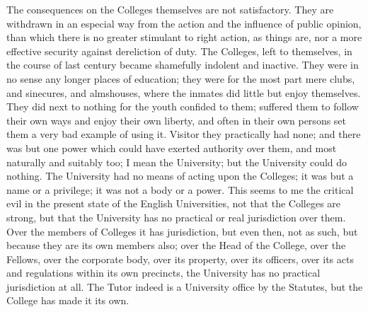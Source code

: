 The consequences on the
Colleges themselves are not satisfactory. They are withdrawn in an
especial way from the action and the influence of public opinion, than
which there is no greater stimulant to right action, as things are,
nor a more effective security against dereliction of duty. The
Colleges, left to themselves, in the course of last century became
shamefully indolent and inactive. They were in no sense any longer
places of education; they were for the most part mere clubs, and
sinecures, and almshouses, where the inmates did little but enjoy
themselves. They did next to nothing for the youth confided to them;
suffered them to follow their own ways and enjoy their own liberty,
and often in their own persons set them a very bad example of using
it. Visitor they practically had none; and there was but one power
which could have exerted authority over them, and most naturally and
suitably too; I mean the University; but the University could do
nothing. The University had no means of acting upon the Colleges; it
was but a name or a privilege; it was not a body or a power. This
seems to me the critical evil in the present state of the English
Universities, not that the Colleges are strong, but that the
University has no practical or real jurisdiction over them. Over the
members of Colleges it has jurisdiction, but even then, not as
such, but because they are its own members also; over the Head of the
College, over the Fellows, over the corporate body, over its property,
over its officers, over its acts and regulations within its own
precincts, the University has no practical jurisdiction at all. The
Tutor indeed is a University office by the Statutes, but the College
has made it its own.

